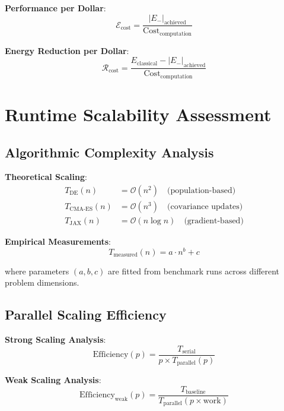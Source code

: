 \documentclass[11pt,a4paper]{article}
\begin{document}
\textbf{Performance per Dollar}:
\begin{equation}
\mathcal{E}_{\text{cost}} = \frac{|E_-|_{\text{achieved}}}{\text{Cost}_{\text{computation}}}
\end{equation}

\textbf{Energy Reduction per Dollar}:
\begin{equation}
\mathcal{R}_{\text{cost}} = \frac{E_{\text{classical}} - |E_-|_{\text{achieved}}}{\text{Cost}_{\text{computation}}}
\end{equation}

\section{Runtime Scalability Assessment}

\subsection{Algorithmic Complexity Analysis}

\textbf{Theoretical Scaling}:
\begin{align}
T_{\text{DE}}(n) &= \mathcal{O}(n^2) \quad \text{(population-based)} \\
T_{\text{CMA-ES}}(n) &= \mathcal{O}(n^3) \quad \text{(covariance updates)} \\
T_{\text{JAX}}(n) &= \mathcal{O}(n \log n) \quad \text{(gradient-based)}
\end{align}

\textbf{Empirical Measurements}:
\begin{equation}
T_{\text{measured}}(n) = a \cdot n^b + c
\end{equation}

where parameters $(a, b, c)$ are fitted from benchmark runs across different problem dimensions.

\subsection{Parallel Scaling Efficiency}

\textbf{Strong Scaling Analysis}:
\begin{equation}
\text{Efficiency}(p) = \frac{T_{\text{serial}}}{p \times T_{\text{parallel}}(p)}
\end{equation}

\textbf{Weak Scaling Analysis}:
\begin{equation}
\text{Efficiency}_{\text{weak}}(p) = \frac{T_{\text{baseline}}}{T_{\text{parallel}}(p \times \text{work})}
\end{equation}
\end{document}
